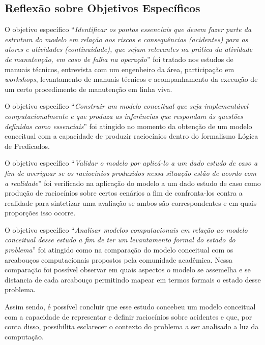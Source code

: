 \subsection{Reflexão sobre Objetivos Específicos}\label{reflexobespecifico}


O objetivo específico ``\textit{Identificar os pontos essenciais que devem fazer parte da estrutura do modelo em relação aos riscos e consequências (acidentes) para os atores e atividades (continuidade), que sejam relevantes na prática da atividade de manutenção, em caso de falha na operação}'' foi tratado nos estudos de manuais técnicos, entrevista com um engenheiro da área, participação em \textit{workshops}, levantamento de manuais técnicos e acompanhamento da execução de um certo procedimento de manutenção em linha viva.  

O objetivo específico ``\textit{Construir um modelo conceitual que seja implementável computacionalmente e que produza as inferências que respondam às questões definidas como essenciais}'' foi atingido no momento da obtenção de um modelo conceitual com a capacidade de produzir raciocínios dentro do formalismo Lógica de Predicados. 

O objetivo específico ``\textit{Validar o modelo por aplicá-lo a um dado estudo de caso a fim de averiguar se os raciocínios produzidos nessa situação estão de acordo com a realidade}'' foi verificado na aplicação do modelo a um dado estudo de caso como produção de raciocínios sobre certos cenários a fim de confronta-los contra a realidade para sintetizar uma avaliação se ambos são correspondentes e em quais proporções isso ocorre. 

O objetivo específico ``\textit{Analisar modelos computacionais em relação ao modelo conceitual desse estudo a fim de ter um levantamento formal do estado do problema}'' foi atingido como na comparação do modelo conceitual com os arcabouços computacionais propostos pela comunidade acadêmica. Nessa comparação foi possível observar em quais aspectos o modelo se assemelha e se distancia de cada arcabouço permitindo mapear em termos formais o estado desse problema. 

Assim sendo, é possível concluir que esse estudo concebeu um modelo conceitual com a capacidade de representar e definir raciocínios sobre acidentes e que, por conta disso, possibilita esclarecer o contexto do problema a ser analisado a luz da computação. 